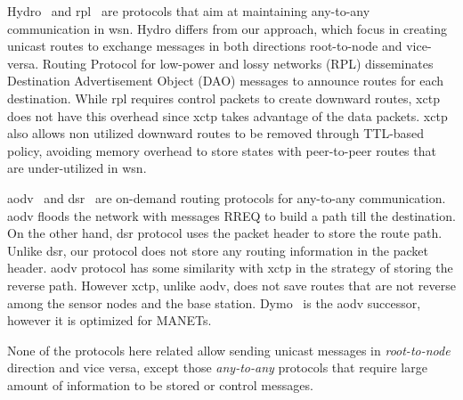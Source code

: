 Hydro~\cite{hydro} and \ac{rpl}~\cite{RPL} are protocols that aim at maintaining any-to-any communication in \ac{wsn}. Hydro differs from our approach, which focus in creating unicast routes to exchange messages in both directions root-to-node and vice-versa. Routing Protocol for low-power and lossy networks (RPL) disseminates Destination Advertisement Object (DAO) messages to announce routes for each destination. While \ac{rpl} requires control packets to create downward routes, \ac{xctp} does not have this overhead since \ac{xctp} takes advantage of the data packets. \ac{xctp} also allows non utilized downward routes to be removed through TTL-based policy, avoiding memory overhead to store states with peer-to-peer routes that are under-utilized in \ac{wsn}.

\ac{aodv}~\cite{AODV} and \ac{dsr}~\cite{DSR} are on-demand routing protocols for any-to-any communication. \ac{aodv} floods the network with messages RREQ to build a path till the destination. On the other hand, \ac{dsr} protocol uses the packet header to store the route path. Unlike \ac{dsr}, our protocol does not store any routing information in the packet header. \ac{aodv} protocol has some similarity with \ac{xctp} in the strategy of storing the reverse path. However \ac{xctp}, unlike \ac{aodv}, does not save routes that are not reverse among the sensor nodes and the base station. Dymo~\cite{dymo} is the \ac{aodv} successor, however it is optimized for MANETs.

None of the protocols here related allow sending unicast messages in  \textit{root-to-node} direction and vice versa, except those  \textit{any-to-any} protocols that require large amount of information to be stored or control messages.